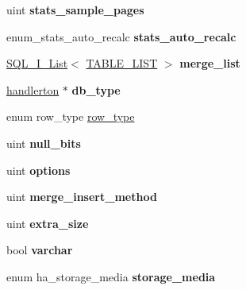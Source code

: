 \begin{DoxyCompactItemize}
uint {\bfseries stats\+\_\+sample\+\_\+pages}
\item 
\mbox{\label{structst__ha__create__information_af4ad4bb7d60b3c2ba8b99d429fad3a58}} 
enum\+\_\+stats\+\_\+auto\+\_\+recalc {\bfseries stats\+\_\+auto\+\_\+recalc}
\item 
\mbox{\label{structst__ha__create__information_ad918278be391ac752ac3c1e547b82ca9}} 
\mbox{\hyperlink{classSQL__I__List}{S\+Q\+L\+\_\+\+I\+\_\+\+List}}$<$ \mbox{\hyperlink{structTABLE__LIST}{T\+A\+B\+L\+E\+\_\+\+L\+I\+ST}} $>$ {\bfseries merge\+\_\+list}
\item 
\mbox{\label{structst__ha__create__information_ab90e1345e9f9ffe3d490d2f7490c94ee}} 
\mbox{\hyperlink{structhandlerton}{handlerton}} $\ast$ {\bfseries db\+\_\+type}
\item 
enum row\+\_\+type \mbox{\hyperlink{structst__ha__create__information_a2fd611ab0e3c6de92e58f50ca56efd76}{row\+\_\+type}}
\item 
\mbox{\label{structst__ha__create__information_a5c4b35b84eaae9d2a37c0042db559787}} 
uint {\bfseries null\+\_\+bits}
\item 
\mbox{\label{structst__ha__create__information_a4f97d98c8e08708fc803d2d449ea8ac6}} 
uint {\bfseries options}
\item 
\mbox{\label{structst__ha__create__information_aed85b8a2ab8f0057e9cd99a527829a03}} 
uint {\bfseries merge\+\_\+insert\+\_\+method}
\item 
\mbox{\label{structst__ha__create__information_a7607724aec42e37a88b6e2c201f66310}} 
uint {\bfseries extra\+\_\+size}
\item 
\mbox{\label{structst__ha__create__information_a5097123ec1ecfe79de9800bddae2f798}} 
bool {\bfseries varchar}
\item 
\mbox{\label{structst__ha__create__information_a2eafce99462ce553ca9201058618fc49}} 
enum ha\+\_\+storage\+\_\+media {\bfseries storage\+\_\+media}
\end{DoxyCompactItemize}


